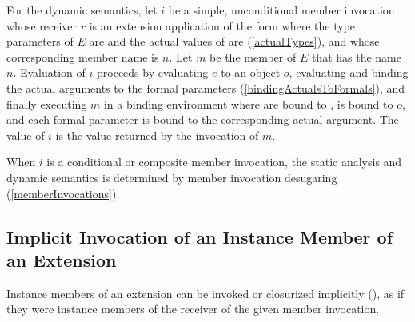 \documentclass[makeidx]{article}
\begin{document}
\LMHash{}%
%
For the dynamic semantics,
let $i$ be a simple, unconditional member invocation
whose receiver $r$ is an extension application of the form
%
where the type parameters of $E$ are 
and the actual values of  are 
(\ref{actualTypes}),
%
and whose corresponding member name is $n$.
Let $m$ be the member of $E$ that has the name $n$.
Evaluation of $i$ proceeds by evaluating
$e$ to an object $o$,
evaluating and binding the actual arguments to the formal parameters
(\ref{bindingActualsToFormals}),
and finally executing $m$
in a binding environment where  are bound to ,
\THIS{} is bound to $o$,
and each formal parameter is bound to the corresponding actual argument.
The value of $i$ is the value returned by the invocation of $m$.

\LMHash{}%
When $i$ is a conditional or composite member invocation,
the static analysis and dynamic semantics is determined by
member invocation desugaring
(\ref{memberInvocations}).



\subsection{Implicit Invocation of an Instance Member of an Extension}

\LMHash{}%
Instance members of an extension can be invoked or closurized implicitly
(),
as if they were instance members of the receiver of
the given member invocation.

\end{document}
